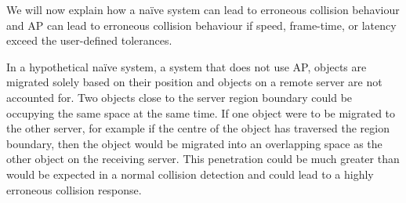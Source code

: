 


We will now explain how a naïve system can lead to erroneous collision behaviour and AP can lead to erroneous collision behaviour if speed, frame-time, or latency exceed the user-defined tolerances. 

In a hypothetical naïve system, a system that does not use AP, objects are migrated solely based on their position and objects on a remote server are not accounted for. Two objects close to the server region boundary could be occupying the same space at the same time. If one object were to be migrated to the other server, for example if the centre of the object has traversed the region boundary, then the object would be migrated into an overlapping space as the other object on the receiving server. This penetration could be much greater than would be expected in a normal collision detection and could lead to a highly erroneous collision response.

